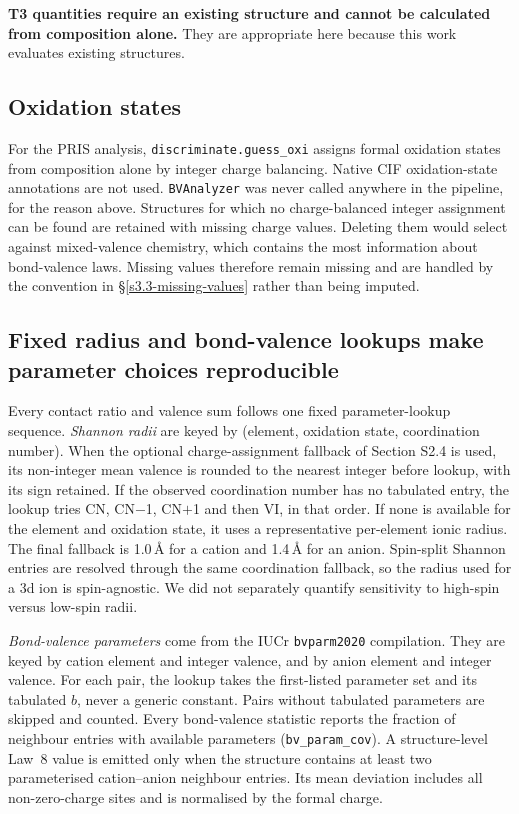 \textbf{T3 quantities require an existing structure and cannot be calculated
from composition alone.} They are appropriate here because this work evaluates
existing structures.

\subsection{Oxidation states}\label{s3.1-oxidation-states}

For the PRIS analysis, \texttt{discriminate.guess\_oxi} assigns formal oxidation states
from composition alone by integer charge balancing. Native CIF oxidation-state
annotations are not used. \texttt{BVAnalyzer} was never called anywhere in the pipeline,
for the reason above. Structures for which no charge-balanced integer assignment can be
found are retained with missing charge values. Deleting them would select
against mixed-valence chemistry, which contains the most information about
bond-valence laws. Missing values therefore remain missing and are handled by
the convention in \S{}\ref{s3.3-missing-values} rather than being imputed.

\subsection{Fixed radius and bond-valence lookups make parameter choices reproducible}
\label{s3.1b-lookup}

Every contact ratio and valence sum follows one fixed parameter-lookup sequence.
\emph{Shannon radii} are keyed by (element, oxidation
state, coordination number). When the optional charge-assignment fallback of Section S2.4 is
used, its non-integer mean valence is rounded to the nearest integer before lookup, with its sign
retained. If the observed coordination number has no tabulated entry, the lookup
tries CN, CN$-$1, CN$+$1 and then VI, in that order. If none is available for
the element and oxidation state, it uses a representative per-element ionic
radius. The final fallback is 1.0\,\AA{} for a cation and 1.4\,\AA{} for an
anion. Spin-split Shannon entries are resolved
through the same coordination fallback, so the radius used for a 3d ion is
spin-agnostic. We did not separately quantify sensitivity to high-spin versus
low-spin radii.

\emph{Bond-valence parameters} come from the IUCr \texttt{bvparm2020}
compilation. They are keyed by cation element and integer valence, and by anion
element and integer valence. For each pair, the lookup takes the first-listed
parameter set and its tabulated $b$, never a generic constant. Pairs without
tabulated parameters are skipped and counted. Every bond-valence statistic
reports the fraction of neighbour entries with available parameters
(\texttt{bv\_param\_cov}). A structure-level Law~8 value is emitted only when
the structure contains at least two parameterised cation--anion neighbour
entries. Its mean deviation includes all non-zero-charge sites and is normalised
by the formal charge.

